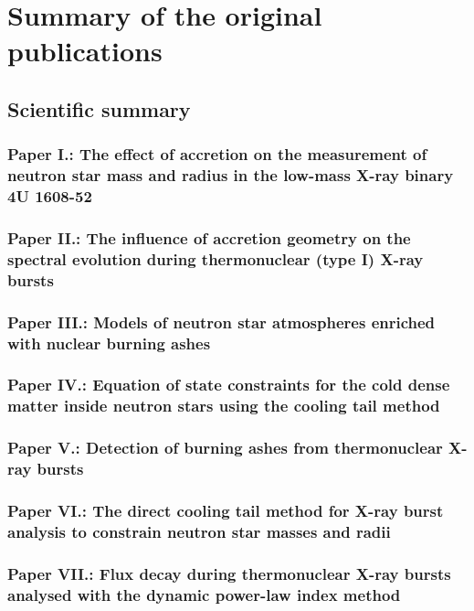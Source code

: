 \chapter{Summary of the original publications}

\section{Scientific summary}




\subsection*{Paper I.: The effect of accretion on the measurement of neutron star mass and radius in the low-mass X-ray binary 4U 1608-52}


\subsection*{Paper II.: The influence of accretion geometry on the spectral evolution during thermonuclear (type I) X-ray bursts}


\subsection*{Paper III.: Models of neutron star atmospheres enriched with nuclear burning ashes}


\subsection*{Paper IV.: Equation of state constraints for the cold dense matter inside neutron stars using the cooling tail method}


\subsection*{Paper V.: Detection of burning ashes from thermonuclear X-ray bursts}


\subsection*{Paper VI.: The direct cooling tail method for X-ray burst analysis to constrain neutron star masses and radii}


\subsection*{Paper VII.: Flux decay during thermonuclear X-ray bursts analysed with the dynamic power-law index method}


